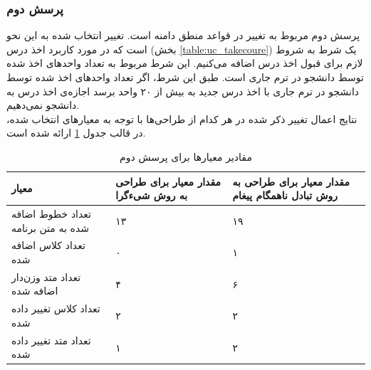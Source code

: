 \subsubsection{پرسش دوم}
پرسش دوم مربوط به تغییر در قواعد منطق دامنه است. تغییر انتخاب شده به این نحو است که در مورد کاربرد اخذ درس (بخش \ref{table:uc_takecoure}) یک شرط به شروط لازم برای قبول اخذ درس اضافه می‌کنیم. این شرط مربوط به تعداد واحدهای اخذ شده توسط دانشجو در ترم جاری است. طبق این شرط، اگر تعداد واحدهای اخذ شده توسط دانشجو در ترم جاری با اخذ درس جدید به بیش از ۲۰ واحد برسد اجازه‌ی اخذ درس به دانشجو نمی‌دهیم.\\
نتایج اعمال تغییر ذکر شده در هر کدام از طراحی‌ها با توجه به معیارهای انتخاب شده، در قالب جدول \ref{table:mod_result_2} ارائه شده است.


\begin{table}[hb]
\small
\begin{center}
\begin{tabular}{|p{7cm}|p{4cm}|p{4cm}|}
	\hline
\textbf{معیار} & \textbf{مقدار معیار برای طراحی به روش شیءگرا} & \textbf{مقدار معیار برای طراحی به روش تبادل ناهمگام پیغام} 
\\ 
	\hline
	تعداد خطوط اضافه شده به متن برنامه
	 &
	۱۳
	 &
	 ۱۹
\\
	\hline
	تعداد کلاس اضافه شده
	 &
	 ۰
	 &
	 ۱
\\
	\hline
	تعداد متد وزن‌دار اضافه شده
	 &
	 ۴
	 &
	 ۶
\\
	\hline

	تعداد کلاس تغییر داده شده
	 &
	۲
	 &
	 ۲
\\
	\hline

	تعداد متد تغییر داده شده
	 &
	۱
	 &
	 ۲
\\
	\hline

\end{tabular}
\caption{\label{table:mod_result_2} مقادیر معیارها برای پرسش دوم}
\end{center}
\end{table}





